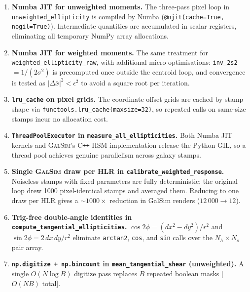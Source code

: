 \begin{enumerate}
  \item \textbf{Numba JIT for unweighted moments.}
    The three-pass pixel loop in \texttt{unweighted\_ellipticity} is compiled by
    Numba (\texttt{@njit(cache=True, nogil=True)}). Intermediate quantities are
    accumulated in scalar registers, eliminating all temporary NumPy array
    allocations.

  \item \textbf{Numba JIT for weighted moments.}
    The same treatment for \texttt{weighted\_ellipticity\_raw}, with additional
    micro-optimisations: \texttt{inv\_2s2} $= 1/(2\sigma^2)$ is precomputed
    once outside the centroid loop, and convergence is tested as
    $|\Delta\bar{x}|^2 < \epsilon^2$ to avoid a square root per iteration.

  \item \textbf{\texttt{lru\_cache} on pixel grids.}
    The coordinate offset grids are cached by stamp shape via
    \texttt{functools.lru\_cache(maxsize=32)}, so repeated calls on same-size
    stamps incur no allocation cost.

  \item \textbf{\texttt{ThreadPoolExecutor} in \texttt{measure\_all\_ellipticities}.}
    Both Numba JIT kernels and \textsc{GalSim}'s C\texttt{++} HSM implementation
    release the Python GIL, so a thread pool achieves genuine parallelism across
    galaxy stamps.

  \item \textbf{Single \textsc{GalSim} draw per HLR in
        \texttt{calibrate\_weighted\_response}.}
    Noiseless stamps with fixed parameters are fully deterministic; the original
    loop drew 1000 pixel-identical stamps and averaged them. Reducing to one draw
    per HLR gives a ${\sim}1000\times$ reduction in GalSim renders
    ($12\,000 \to 12$).

  \item \textbf{Trig-free double-angle identities in
        \texttt{compute\_tangential\_ellipticities}.}
    $\cos 2\phi = (dx^2-dy^2)/r^2$ and $\sin 2\phi = 2\,dx\,dy/r^2$ eliminate
    \texttt{arctan2}, \texttt{cos}, and \texttt{sin} calls over the
    $N_h \times N_s$ pair array.

  \item \textbf{\texttt{np.digitize\,+\,np.bincount} in
        \texttt{mean\_tangential\_shear} (unweighted).}
    A single $O(N\log B)$ digitize pass replaces $B$ repeated boolean
    masks [$O(NB)$ total].


\end{enumerate}
